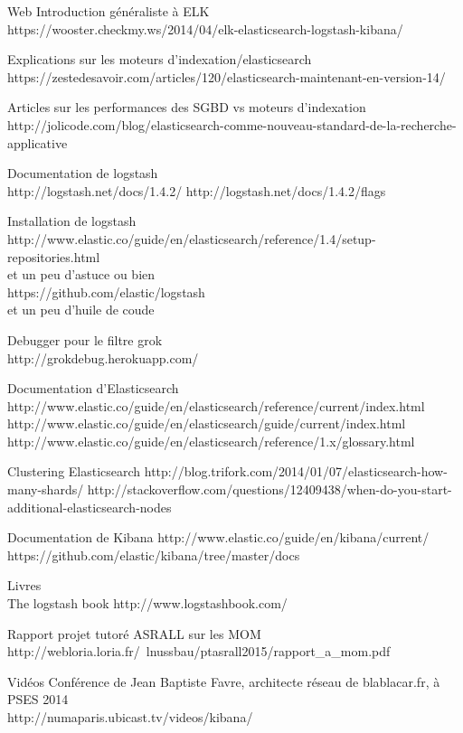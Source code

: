 Web
Introduction généraliste à ELK \\

https://wooster.checkmy.ws/2014/04/elk-elasticsearch-logstash-kibana/

Explications sur les moteurs d'indexation/elasticsearch\\
https://zestedesavoir.com/articles/120/elasticsearch-maintenant-en-version-14/

Articles sur les performances des SGBD vs moteurs d'indexation
http://jolicode.com/blog/elasticsearch-comme-nouveau-standard-de-la-recherche-applicative


Documentation de logstash\\
http://logstash.net/docs/1.4.2/
http://logstash.net/docs/1.4.2/flags

Installation de logstash
http://www.elastic.co/guide/en/elasticsearch/reference/1.4/setup-repositories.html
\\ et un peu d'astuce ou bien \\
https://github.com/elastic/logstash
\\ et un peu d'huile de coude


Debugger pour le filtre grok\\
http://grokdebug.herokuapp.com/


Documentation d'Elasticsearch\\
http://www.elastic.co/guide/en/elasticsearch/reference/current/index.html\\
http://www.elastic.co/guide/en/elasticsearch/guide/current/index.html
http://www.elastic.co/guide/en/elasticsearch/reference/1.x/glossary.html

Clustering Elasticsearch
http://blog.trifork.com/2014/01/07/elasticsearch-how-many-shards/
http://stackoverflow.com/questions/12409438/when-do-you-start-additional-elasticsearch-nodes


Documentation de Kibana
http://www.elastic.co/guide/en/kibana/current/
https://github.com/elastic/kibana/tree/master/docs


Livres\\
The logstash book
http://www.logstashbook.com/

Rapport projet tutoré ASRALL sur les MOM
http://webloria.loria.fr/~lnussbau/ptasrall2015/rapport\_a\_mom.pdf


Vidéos
Conférence de Jean Baptiste Favre, architecte réseau de blablacar.fr, à PSES 2014\\
http://numaparis.ubicast.tv/videos/kibana/
